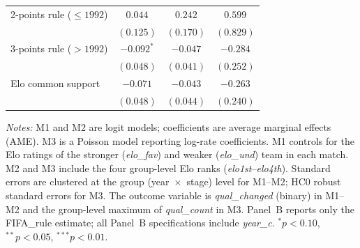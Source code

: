 \begin{table}[H]
\begin{threeparttable}
\begin{tabular}{l cc cc cc}
2-points rule ($\le 1992$) & \multicolumn{2}{c}{$0.044$} & \multicolumn{2}{c}{$0.242$} & \multicolumn{2}{c}{$0.599$} \\
                        & \multicolumn{2}{c}{$(0.125)$} & \multicolumn{2}{c}{$(0.170)$} & \multicolumn{2}{c}{$(0.829)$} \\
3-points rule ($> 1992$) & \multicolumn{2}{c}{$-0.092^{*}$} & \multicolumn{2}{c}{$-0.047$} & \multicolumn{2}{c}{$-0.284$} \\
                        & \multicolumn{2}{c}{$(0.048)$} & \multicolumn{2}{c}{$(0.041)$} & \multicolumn{2}{c}{$(0.252)$} \\
Elo common support      & \multicolumn{2}{c}{$-0.071$} & \multicolumn{2}{c}{$-0.043$} & \multicolumn{2}{c}{$-0.263$} \\
                        & \multicolumn{2}{c}{$(0.048)$} & \multicolumn{2}{c}{$(0.044)$} & \multicolumn{2}{c}{$(0.240)$} \\
\bottomrule
\end{tabular}
\begin{tablenotes}
\small
\item \textit{Notes:} M1 and M2 are logit models; coefficients are average marginal effects (AME). M3 is a Poisson model reporting log-rate coefficients. M1 controls for the Elo ratings of the stronger (\textit{elo\_fav}) and weaker (\textit{elo\_und}) team in each match. M2 and M3 include the four group-level Elo ranks (\textit{elo1st}--\textit{elo4th}). Standard errors are clustered at the group (year~$\times$~stage) level for M1--M2; HC0 robust standard errors for M3. The outcome variable is \textit{qual\_changed} (binary) in M1--M2 and the group-level maximum of \textit{qual\_count} in M3. Panel~B reports only the FIFA\_rule estimate; all Panel~B specifications include \textit{year\_c}. $^{*}p<0.10$, $^{**}p<0.05$, $^{***}p<0.01$.
\end{tablenotes}
\end{threeparttable}
\end{table}
